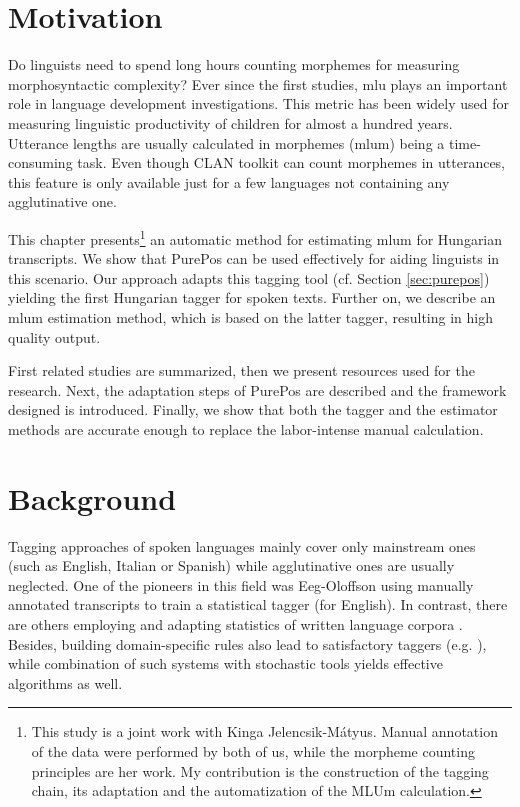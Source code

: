 
\section{Motivation}

Do linguists need to spend long hours counting morphemes for measuring morphosyntactic complexity? 
Ever since the first studies, \gls{mlu} plays an important role in language development investigations. 
This metric has been widely used for measuring linguistic productivity of children for almost a hundred years. 
Utterance lengths are usually calculated in morphemes (\acrshort{mlum}) being a time-consuming task. 
Even though CLAN toolkit \cite{MacWhinney1992} can count morphemes in utterances, this feature is only available just for a few languages not containing any agglutinative one. %

This chapter presents\footnote{This study is a joint work with Kinga Jelencsik-Mátyus. 
Manual annotation of the data were performed by both of us, while the morpheme counting principles are her work. 
My contribution is the construction of the tagging chain, its adaptation and the automatization of the MLUm calculation.} 
an automatic method for estimating \acrshort{mlum} for Hungarian transcripts. 
We show that PurePos can be used effectively for aiding linguists in this scenario. 
Our approach adapts this tagging tool (cf. Section \ref{sec:purepos}) yielding the first Hungarian tagger for spoken texts. 
Further on, we describe an \acrshort{mlum} estimation method, which is based on the latter tagger, resulting in high quality output. 

First related studies are summarized, then we present resources used for the research. 
Next, the adaptation steps of PurePos are described and the framework designed is introduced. 
Finally, we show that both the tagger and the estimator methods are accurate enough to replace the labor-intense manual calculation.

\section{Background}

Tagging approaches of spoken languages mainly cover only mainstream ones (such as English, Italian or Spanish) while agglutinative ones are usually neglected. 
One of the pioneers in this field was Eeg-Oloffson \cite{Svartvik1982} using  manually annotated transcripts to train a statistical tagger (for English). 
In contrast, there are others employing and adapting statistics of written language corpora \cite{Mendes2004,Nivre1996,Panunzi2004}.
Besides, building domain-specific rules also lead to satisfactory taggers (e.g. \cite{Moreno2003}),
while combination of such systems with stochastic tools \cite{Bick2012} yields effective algorithms as well. 

